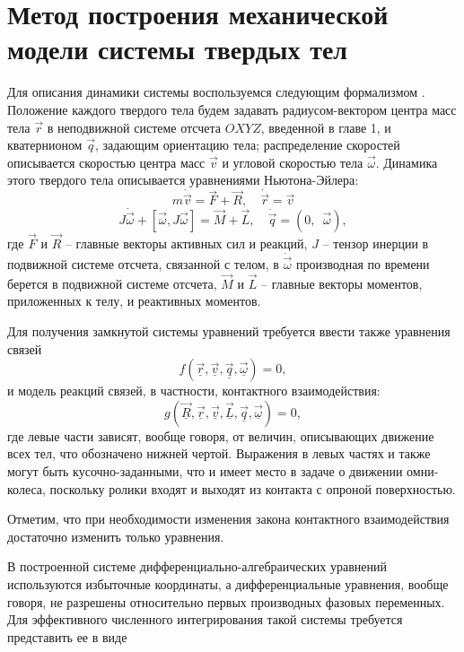 \section{Метод построения механической модели системы твердых тел}

Для описания динамики системы воспользуемся следующим формализмом \cite{Kosenko2006,Kosenko2007,KosenkoQuaternionRus}. Положение каждого твердого тела будем задавать радиусом-вектором центра масс тела $\vec{r}$ в неподвижной системе отсчета $OXYZ$, введенной в главе 1, и кватернионом $\vec{q}$, задающим ориентацию тела; распределение скоростей описывается скоростью центра масс $\vec{v}$ и угловой скоростью тела $\vec{\omega}$.
Динамика этого твердого тела описывается уравнениями Ньютона-Эйлера:
$$ m\dot{\vec{v}} = \vec{F} + \vec{R}, \quad \dot{\vec{r}} = \vec{v} $$
$$ J\dot{\vec{\omega}} + [ \vec{\omega}, J\vec{\omega} ] = \vec{M} + \vec{L}, \quad \dot{\vec{q}} = (0, \enspace \vec{\omega}), $$
где $\vec{F}$ и $\vec{R}$ -- главные векторы активных сил и реакций, $J$ -- тензор инерции в подвижной системе отсчета, связанной с телом, в $\dot{\vec{\omega}}$ производная по времени берется в подвижной системе отсчета, $\vec{M}$ и $\vec{L}$ -- главные векторы моментов, приложенных к телу, и реактивных моментов.

Для получения замкнутой системы уравнений требуется ввести также уравнения связей 
\begin{equation}\label{eq:mo_cstr}
    f(\vec{\underline{r}}, \vec{\underline{v}}, \vec{\underline{q}}, \vec{\underline{\omega}}) = 0,
\end{equation}
и модель реакций связей, в частности, контактного взаимодействия:
\begin{equation}\label{eq:mo_reac}
    g(\vec{\underline{R}}, \vec{\underline{r}}, \vec{\underline{v}}, \vec{\underline{L}}, \vec{\underline{q}}, \vec{\underline{\omega}}) = 0,
\end{equation}
где левые части зависят, вообще говоря, от величин, описывающих движение всех тел, что обозначено нижней чертой. Выражения в левых частях и также могут быть кусочно-заданными, что и имеет место в задаче о движении омни-колеса, поскольку ролики входят и выходят из контакта с опроной поверхностью.

Отметим, что при необходимости изменения закона контактного взаимодействия достаточно изменить только уравнения.

В построенной системе дифференциально-алгебраических уравнений используются избыточные координаты, а дифференциальные уравнения, вообще говоря, не разрешены относительно первых производных фазовых переменных. Для эффективного численного интегрирования такой системы требуется \cite{kosenkoBook2012modelirovanie} представить ее в виде

